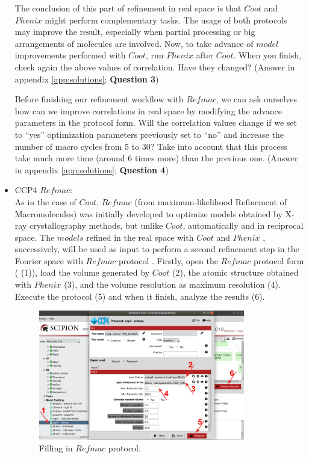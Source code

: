 \begin{itemize}
  The conclusion of this part of refinement in real space is that $Coot$ and $Phenix$  might perform complementary tasks. The usage of both protocols may improve the result, especially when partial processing or big arrangements of molecules are involved. Now, to take advance of $model$ improvements performed with $Coot$, run $Phenix$  after $Coot$. When you finish, check again the above values of correlation. Have they changed? (Answer in appendix \ref{app:solutions}; \textbf{Question 3})
  
  Before finishing our refinement workflow with $Refmac$, we can ask ourselves how can we improve correlations in real space by modifying the advance parameters in the protocol form. Will the correlation values change if we set to ``yes'' optimization parameters previously set to ``no'' and increase the number of macro cycles from 5 to 30? Take into account that this process take much more time (around 6 times more) than the previous one. (Answer in appendix \ref{app:solutions}; \textbf{Question 4})\\
  
  \item CCP4 $Refmac$:\\
  
  As in the case of $Coot$, $Refmac$ (from maximum-likelihood Refinement of Macromolecules) was initially developed to optimize models obtained by X-ray crystallography methods, but unlike $Coot$, automatically and in reciprocal space. The $models$ refined in the real space with $Coot$ and $Phenix$ , successively, will be used as input to perform a second refinement step in the Fourier space with $Refmac$ protocol . Firstly, open the $Refmac$ protocol form ( (1)), load the volume generated by $Coot$ (2), the atomic structure obtained with $Phenix$  (3), and the volume resolution as maximum resolution (4). Execute the protocol (5) and when it finish, analyze the results (6).
  
  \begin{figure}[H]
  \centering 
  \captionsetup{width=.7\linewidth} 
  \includegraphics[width=0.85\textwidth]{Images/Fig31.png}
  \caption{Filling in $Refmac$ protocol.}
  \label{fig:refmac_protocol}
  \end{figure}
  

\end{itemize}
